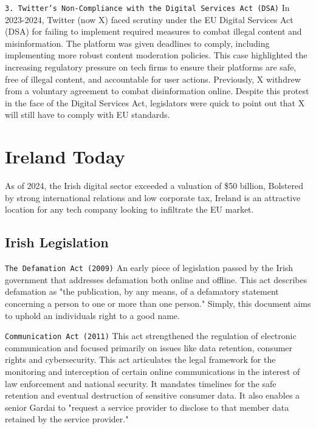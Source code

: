 \texttt{3. Twitter's Non-Compliance with the Digital Services Act (DSA)}
In 2023-2024, Twitter (now X) faced scrutiny under the EU Digital Services Act (DSA) for failing to implement required measures to combat illegal content and misinformation. \cite{twitter2023} The platform was given deadlines to comply, including implementing more robust content moderation policies. This case highlighted the increasing regulatory pressure on tech firms to ensure their platforms are safe, free of illegal content, and accountable for user actions. Previously, X withdrew from a voluntary agreement to combat disinformation online. Despite this protest in the face of the Digital Services Act, legislators were quick to point out that X will still have to comply with EU standards. \cite{bhr2023}



\section{Ireland Today}
As of 2024, the Irish digital sector exceeded a valuation of \$50 billion, \cite{tradegov2025} Bolstered by strong international relations and low corporate tax, Ireland is an attractive location for any tech company looking to infiltrate the EU market. 

\subsection{Irish Legislation}
\texttt{The Defamation Act (2009)}
An early piece of legislation passed by the Irish government that addresses defamation both online and offline. This act describes defamation as "the publication, by any means, of a defamatory statement concerning a person to one or more than one person." \cite{defamation2009} Simply, this document aims to uphold an individuals right to a good name.

\texttt{Communication Act (2011)}
This act strengthened the regulation of electronic communication and focused primarily on issues like data retention, consumer rights and cybersecurity. This act articulates the legal framework for the monitoring and interception of certain online communications in the interest of law enforcement and national security. It mandates timelines for the safe retention and eventual destruction of sensitive consumer data. It also enables a senior Gardai to "request a service provider to disclose to that member data retained by the service provider." \cite{communications2011}

